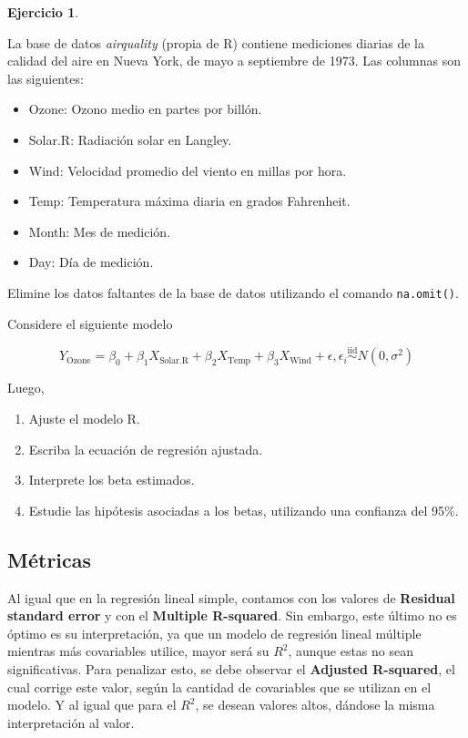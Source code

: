 \documentclass[
  11pt,
]{book}
\providecommand{\tightlist}{%
  \setlength{\itemsep}{0pt}\setlength{\parskip}{0pt}}
\theoremstyle{definition}
\theoremstyle{definition}
\theoremstyle{definition}
\newtheorem{exercise}{Ejercicio}[chapter]
\theoremstyle{definition}
\theoremstyle{remark}
\begin{document}
\begin{exercise}
\protect\hypertarget{exr:calidad-aire}{}\label{exr:calidad-aire}

La base de datos \emph{airquality} (propia de R) contiene mediciones diarias de la calidad del aire en Nueva York, de mayo a septiembre de 1973. Las columnas son las siguientes:

\begin{itemize}
\tightlist
\item
  Ozone: Ozono medio en partes por billón.
\item
  Solar.R: Radiación solar en Langley.
\item
  Wind: Velocidad promedio del viento en millas por hora.
\item
  Temp: Temperatura máxima diaria en grados Fahrenheit.
\item
  Month: Mes de medición.
\item
  Day: Día de medición.
\end{itemize}

Elimine los datos faltantes de la base de datos utilizando el comando \texttt{na.omit()}.

Considere el siguiente modelo

\[
Y_{\text{Ozone}} = \beta_0 + \beta_1X_{\text{Solar.R}} + \beta_2X_{\text{Temp}} + \beta_3X_{\text{Wind}} + \epsilon, \epsilon_i \overset{\text{iid}}{\sim} N(0,\sigma^2)
\]

Luego,

\begin{enumerate}
\def\labelenumi{\arabic{enumi}.}
\tightlist
\item
  Ajuste el modelo R.
\item
  Escriba la ecuación de regresión ajustada.
\item
  Interprete los beta estimados.
\item
  Estudie las hipótesis asociadas a los betas, utilizando una confianza del 95\%.
\end{enumerate}

\end{exercise}

\subsection{Métricas}\label{metricasRLM}

Al igual que en la regresión lineal simple, contamos con los valores de \textbf{Residual standard error} y con el \textbf{Multiple R-squared}. Sin embargo, este último no es óptimo es su interpretación, ya que un modelo de regresión lineal múltiple mientras más covariables utilice, mayor será su \(R^2\), aunque estas no sean significativas. Para penalizar esto, se debe observar el \textbf{Adjusted R-squared}, el cual corrige este valor, según la cantidad de covariables que se utilizan en el modelo. Y al igual que para el \(R^2\), se desean valores altos, dándose la misma interpretación al valor.
\end{document}
